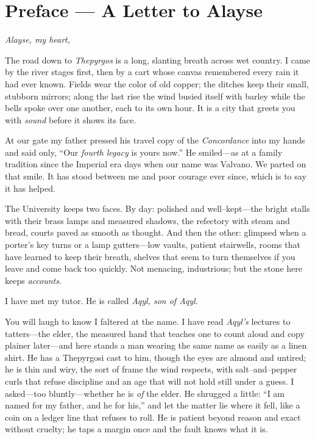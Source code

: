 \documentclass[11pt]{article}
\numberwithin{equation}{section} %
\theoremstyle{plain} %
\theoremstyle{definition} %
\theoremstyle{remark} %
\begin{document}
\clearpage
\section*{Preface — A Letter to Alayse}
\label{sec:preface-markus-to-alayse}
{}

\noindent\textit{Alayse, my heart,}

The road down to \textit{Thepyrgos} is a long, slanting breath across wet country. I came by the river stages first, then by a cart whose canvas remembered every rain it had ever known. Fields wear the color of old copper; the ditches keep their small, stubborn mirrors; along the last rise the wind busied itself with barley while the bells spoke over one another, each to its own hour. It is a city that greets you with \emph{sound} before it shows its face.

At our gate my father pressed his travel copy of the \emph{Concordance} into my hands and said only, “Our \emph{fourth legacy} is yours now.” He smiled—as at a family tradition since the Imperial era days when our name was Valvano. We parted on that smile. It has stood between me and poor courage ever since, which is to say it has helped.

\medskip
The University keeps two faces. By day: polished and well–kept—the bright stalls with their brass lamps and measured shadows, the refectory with steam and bread, courts paved as smooth as thought. And then the other: glimpsed when a porter’s key turns or a lamp gutters—low vaults, patient stairwells, rooms that have learned to keep their breath, shelves that seem to turn themselves if you leave and come back too quickly. Not menacing, industrious; but the stone here keeps \emph{accounts}.

I have met my tutor. He is called \textit{Aqyl, son of Aqyl}.

You will laugh to know I faltered at the name. I have read \emph{Aqyl’s} lectures to tatters—the elder, the measured hand that teaches one to count aloud and copy plainer later—and here stands a man wearing the same name as easily as a linen shirt. He has a Thepyrgosi cast to him, though the eyes are almond and untired; he is thin and wiry, the sort of frame the wind respects, with salt–and–pepper curls that refuse discipline and an age that will not hold still under a guess. I asked—too bluntly—whether he is \emph{of} the elder. He shrugged a little: “I am named for my father, and he for his,” and let the matter lie where it fell, like a coin on a ledger line that refuses to roll. He is patient beyond reason and exact without cruelty; he taps a margin once and the fault knows what it is.
\end{document}
